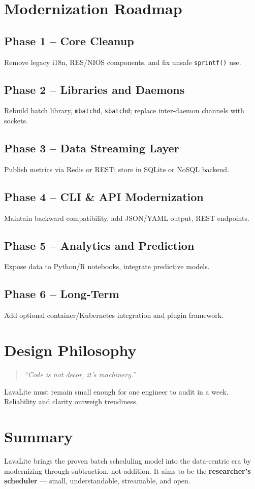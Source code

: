 \documentclass[11pt,a4paper]{article}
\begin{document}
\section{Modernization Roadmap}
\subsection{Phase 1 – Core Cleanup}
Remove legacy i18n, RES/NIOS components, and fix unsafe \texttt{sprintf()} use.

\subsection{Phase 2 – Libraries and Daemons}
Rebuild batch library, \texttt{mbatchd}, \texttt{sbatchd};
replace inter-daemon channels with sockets.

\subsection{Phase 3 – Data Streaming Layer}
Publish metrics via Redis or REST; store in SQLite or NoSQL backend.

\subsection{Phase 4 – CLI \& API Modernization}
Maintain backward compatibility, add JSON/YAML output, REST endpoints.

\subsection{Phase 5 – Analytics and Prediction}
Expose data to Python/R notebooks, integrate predictive models.

\subsection{Phase 6 – Long-Term}
Add optional container/Kubernetes integration and plugin framework.

\section{Design Philosophy}
\begin{quote}
\textit{``Code is not decor, it's machinery.''}
\end{quote}

LavaLite must remain small enough for one engineer to audit in a week.
Reliability and clarity outweigh trendiness.

\section{Summary}
LavaLite brings the proven batch scheduling model into the data-centric era
by modernizing through subtraction, not addition.
It aims to be the \textbf{researcher's scheduler} —
small, understandable, streamable, and open.
\end{document}
